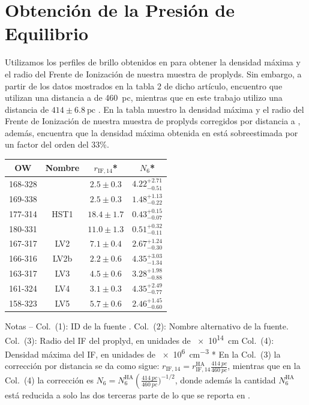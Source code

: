 \section{Obtención de la Presión de Equilibrio}

Utilizamos los perfiles de brillo obtenidos en \citet{HA:1998} para obtener la densidad máxima y el radio del Frente de Ionización de nuestra muestra de proplyds. Sin embargo, a partir de los datos mostrados en la tabla 2 de dicho artículo, encuentro que utilizan una distancia a \thC{} de \SI{460}{pc}, mientras que en este trabajo utilizo una distancia de $414 \pm 6.8 \mathrm{~pc}$ \citep{Menten:2007}. En la tabla  muestro la densidad máxima y el radio del Frente de Ionización de nuestra muestra de proplyds corregidos por distancia a \thC{}, además, \citet{Henney:2001} encuentra que la densidad máxima obtenida en \citet{HA:1998} está sobreestimada por un factor del orden del 33\%.


\begin{table}
  \label{tab:Prop-IF-par}
  \centering
  \begin{tabular}{cccc} \toprule
    OW      & Nombre & $r_{\mathrm{IF}, 14}$*     & $N_6$* \\
    \midrule
    168-328 &        & $2.5 \pm 0.3$  & $4.22^{+2.71}_{-0.51}$ \\
    169-338 &        & $2.5 \pm 0.3$  & $1.48^{+1.13}_{-0.22}$ \\
    177-314 & HST1   & $18.4 \pm 1.7$ & $0.43^{+0.15}_{-0.07}$ \\ 
    180-331 &        & $11.0 \pm 1.3$ & $0.51^{+0.32}_{-0.11}$ \\
    167-317 & LV2    & $7.1 \pm 0.4$  & $2.67^{+1.24}_{-0.30}$ \\
    166-316 & LV2b   & $2.2 \pm 0.6$  & $4.35^{+3.03}_{-1.34}$ \\
    163-317 & LV3    & $4.5 \pm 0.6$  & $3.28^{+1.98}_{-0.88}$ \\
    161-324 & LV4    & $3.1 \pm 0.3$  & $4.35^{+2.49}_{-0.77}$ \\
    158-323 & LV5    & $5.7 \pm 0.6$  & $2.46^{+1.45}_{-0.60}$ \\
  \bottomrule
  \end{tabular}
  \begin{minipage}{0.9\linewidth}
    \footnotesize
    Notas --
%
  Col.~(1): ID de la fuente \citep{ODell:1994a}.
%
  Col.~(2): Nombre alternativo de la fuente.
%
  Col.~(3): Radio del IF del proplyd, en unidades de \SI{e14}{cm}
%
  Col.~(4): Densidad máxima del IF, en unidades de \SI{e6}{cm^{-3}}
%
  * En la Col.~(3) la corrección por distancia se da como sigue: $r_{\mathrm{IF}, 14} = r_{\mathrm{IF}, 14}^{\mathrm{HA}}\frac{\SI{414}{pc}}{\SI{460}{pc}}$, mientras que en la Col.~(4) la corrección es $N_6 = N_6^{\mathrm{HA}}\left(\frac{\SI{414}{pc}}{\SI{460}{pc}})^{-1/2}$, donde además la cantidad $N_6^{\mathrm{HA}}$ está reducida a solo las dos terceras parte de lo que se reporta en \citet{HA:1998}.
  \end{minipage}
\end{table}

